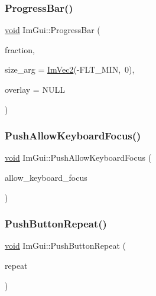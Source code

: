 \subsubsection{\texorpdfstring{Progress\+Bar()}{ProgressBar()}}
{\footnotesize\ttfamily \hyperlink{imgui__impl__opengl3__loader_8h_ac668e7cffd9e2e9cfee428b9b2f34fa7}{void} Im\+Gui\+::\+Progress\+Bar (\begin{DoxyParamCaption}\item[{float}]{fraction,  }\item[{const \hyperlink{structImVec2}{Im\+Vec2} \&}]{size\+\_\+arg = {\ttfamily \hyperlink{structImVec2}{Im\+Vec2}(-\/FLT\+\_\+MIN,~0)},  }\item[{const char $\ast$}]{overlay = {\ttfamily NULL} }\end{DoxyParamCaption})}

\mbox{\label{namespaceImGui_adf7c3cfdcbb06617bb70ff1526d064f4}} 
\subsubsection{\texorpdfstring{Push\+Allow\+Keyboard\+Focus()}{PushAllowKeyboardFocus()}}
{\footnotesize\ttfamily \hyperlink{imgui__impl__opengl3__loader_8h_ac668e7cffd9e2e9cfee428b9b2f34fa7}{void} Im\+Gui\+::\+Push\+Allow\+Keyboard\+Focus (\begin{DoxyParamCaption}\item[{bool}]{allow\+\_\+keyboard\+\_\+focus }\end{DoxyParamCaption})}

\mbox{\label{namespaceImGui_a61d3e0191d67bedaf45f0178f87e3125}} 
\subsubsection{\texorpdfstring{Push\+Button\+Repeat()}{PushButtonRepeat()}}
{\footnotesize\ttfamily \hyperlink{imgui__impl__opengl3__loader_8h_ac668e7cffd9e2e9cfee428b9b2f34fa7}{void} Im\+Gui\+::\+Push\+Button\+Repeat (\begin{DoxyParamCaption}\item[{bool}]{repeat }\end{DoxyParamCaption})}

